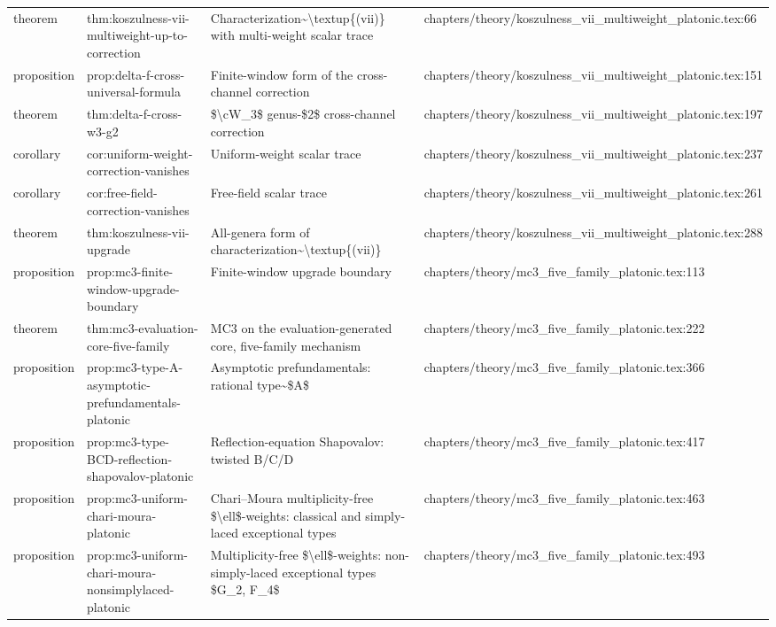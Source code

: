\documentclass[11pt]{article}
\begin{document}
\begin{longtable}{L{0.10\textwidth}L{0.26\textwidth}L{0.42\textwidth}L{0.22\textwidth}}
theorem & thm:koszulness-vii-multiweight-up-to-correction & Characterization\textasciitilde{}\textbackslash{}textup\{(vii)\} with multi-weight scalar trace & chapters/theory/koszulness\_vii\_multiweight\_platonic.tex:66\\
proposition & prop:delta-f-cross-universal-formula & Finite-window form of the cross-channel correction & chapters/theory/koszulness\_vii\_multiweight\_platonic.tex:151\\
theorem & thm:delta-f-cross-w3-g2 & \$\textbackslash{}cW\_3\$ genus-\$2\$ cross-channel correction & chapters/theory/koszulness\_vii\_multiweight\_platonic.tex:197\\
corollary & cor:uniform-weight-correction-vanishes & Uniform-weight scalar trace & chapters/theory/koszulness\_vii\_multiweight\_platonic.tex:237\\
corollary & cor:free-field-correction-vanishes & Free-field scalar trace & chapters/theory/koszulness\_vii\_multiweight\_platonic.tex:261\\
theorem & thm:koszulness-vii-upgrade & All-genera form of characterization\textasciitilde{}\textbackslash{}textup\{(vii)\} & chapters/theory/koszulness\_vii\_multiweight\_platonic.tex:288\\
proposition & prop:mc3-finite-window-upgrade-boundary & Finite-window upgrade boundary & chapters/theory/mc3\_five\_family\_platonic.tex:113\\
theorem & thm:mc3-evaluation-core-five-family & MC3 on the evaluation-generated core, five-family mechanism & chapters/theory/mc3\_five\_family\_platonic.tex:222\\
proposition & prop:mc3-type-A-asymptotic-prefundamentals-platonic & Asymptotic prefundamentals: rational type\textasciitilde{}\$A\$ & chapters/theory/mc3\_five\_family\_platonic.tex:366\\
proposition & prop:mc3-type-BCD-reflection-shapovalov-platonic & Reflection-equation Shapovalov: twisted B/C/D & chapters/theory/mc3\_five\_family\_platonic.tex:417\\
proposition & prop:mc3-uniform-chari-moura-platonic & Chari--Moura multiplicity-free \$\textbackslash{}ell\$-weights: classical and simply-laced exceptional types & chapters/theory/mc3\_five\_family\_platonic.tex:463\\
proposition & prop:mc3-uniform-chari-moura-nonsimplylaced-platonic & Multiplicity-free \$\textbackslash{}ell\$-weights: non-simply-laced exceptional types \$G\_2, F\_4\$ & chapters/theory/mc3\_five\_family\_platonic.tex:493\\

\end{longtable}
\end{document}
